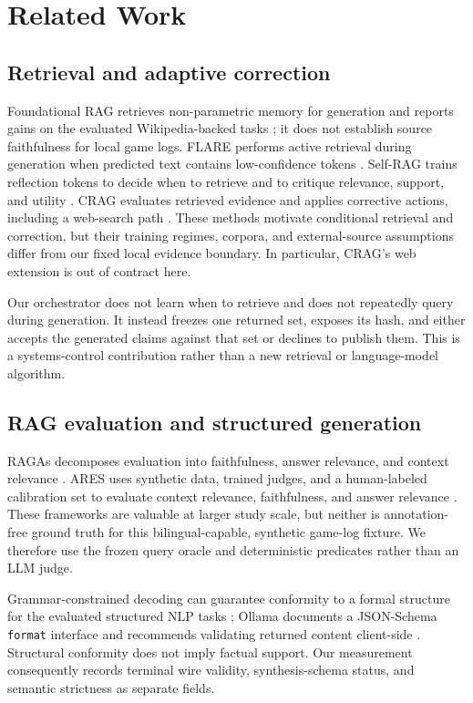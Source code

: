 \documentclass[10pt,twocolumn]{article}
\newcommand{\code}[1]{\texttt{#1}}
\begin{document}
\section{Related Work}
\subsection{Retrieval and adaptive correction}
Foundational RAG retrieves non-parametric memory for generation and reports gains on the evaluated Wikipedia-backed tasks \cite{lewis2020rag}; it does not establish source faithfulness for local game logs.  FLARE performs active retrieval during generation when predicted text contains low-confidence tokens \cite{jiang2023flare}.  Self-RAG trains reflection tokens to decide when to retrieve and to critique relevance, support, and utility \cite{asai2024selfrag}.  CRAG evaluates retrieved evidence and applies corrective actions, including a web-search path \cite{yan2024crag}.  These methods motivate conditional retrieval and correction, but their training regimes, corpora, and external-source assumptions differ from our fixed local evidence boundary.  In particular, CRAG's web extension is out of contract here.

Our orchestrator does not learn when to retrieve and does not repeatedly query during generation.  It instead freezes one returned set, exposes its hash, and either accepts the generated claims against that set or declines to publish them.  This is a systems-control contribution rather than a new retrieval or language-model algorithm.

\subsection{RAG evaluation and structured generation}
RAGAs decomposes evaluation into faithfulness, answer relevance, and context relevance \cite{es2024ragas}.  ARES uses synthetic data, trained judges, and a human-labeled calibration set to evaluate context relevance, faithfulness, and answer relevance \cite{saadfalcon2024ares}.  These frameworks are valuable at larger study scale, but neither is annotation-free ground truth for this bilingual-capable, synthetic game-log fixture.  We therefore use the frozen query oracle and deterministic predicates rather than an LLM judge.

Grammar-constrained decoding can guarantee conformity to a formal structure for the evaluated structured NLP tasks \cite{geng2023grammar}; Ollama documents a JSON-Schema \code{format} interface and recommends validating returned content client-side \cite{ollama2026structured}.  Structural conformity does not imply factual support.  Our measurement consequently records terminal wire validity, synthesis-schema status, and semantic strictness as separate fields.
\end{document}
